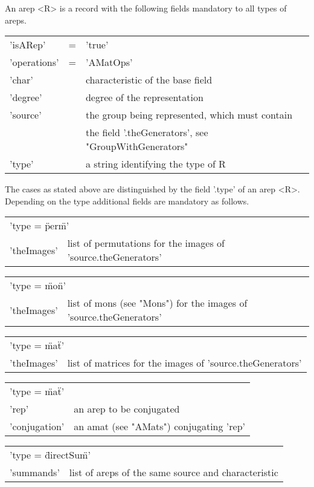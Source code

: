 \bigskip
An arep <R> is a record with the following fields mandatory
to all types of areps.

\bigskip
\begin{center}
\begin{tabular}{lll}
'isARep'     & \:= & 'true'\\
'operations' & \:= & 'AMatOps'\\
'char'       & \: & characteristic of the base field\\
'degree'     & \: & degree of the representation\\
'source'     & \: & the group being represented, which must contain\\
             &    & the field '.theGenerators', see "GroupWithGenerators"\\
'type'       & \: & a string identifying the type of R
\end{tabular}    
\end{center}

The cases as stated above are distinguished by the field '.type'
of an arep <R>. Depending on the type additional fields are mandatory
as follows.

\bigskip
\begin{tabular}{p{2.5cm}p{10cm}}
\multicolumn{2}{l}{'type = \"perm\"\:'}\\
'theImages'    & list of permutations for the images 
of 'source.theGenerators'
\end{tabular}

\begin{tabular}{p{2.5cm}p{10cm}}
\multicolumn{2}{l}{'type = \"mon\"\:'}\\
'theImages'    & list of mons (see "Mons") for the images 
of 'source.theGenerators'
\end{tabular}

\begin{tabular}{p{2.5cm}p{10cm}}
\multicolumn{2}{l}{'type = \"mat\"\:'}\\
'theImages'    & list of matrices for the images 
of 'source.theGenerators'
\end{tabular}

\begin{tabular}{p{2.5cm}p{10cm}}
\multicolumn{2}{l}{'type = \"mat\"\:'}\\
'rep' & an arep to be conjugated\\
'conjugation' & an amat (see "AMats") conjugating 'rep'
\end{tabular}

\begin{tabular}{p{2.5cm}p{10cm}}
\multicolumn{2}{l}{'type = \"directSum\"\:'}\\
'summands'    & list of areps of the same source and characteristic
\end{tabular}

